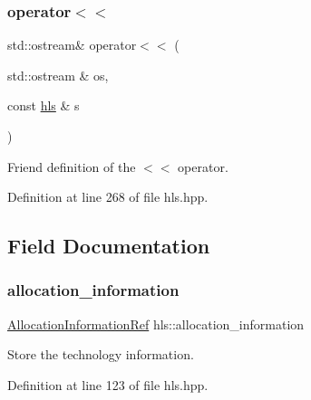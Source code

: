 \subsubsection{\texorpdfstring{operator$<$$<$}{operator<<}}
{\footnotesize\ttfamily std\+::ostream\& operator$<$$<$ (\begin{DoxyParamCaption}\item[{std\+::ostream \&}]{os,  }\item[{const \hyperlink{classhls}{hls} \&}]{s }\end{DoxyParamCaption})\hspace{0.3cm}{\ttfamily [friend]}}



Friend definition of the $<$$<$ operator. 



Definition at line 268 of file hls.\+hpp.



\subsection{Field Documentation}
\mbox{\label{classhls_a277a18e57c5d5a124cfc840174e5a676}} 
\subsubsection{\texorpdfstring{allocation\+\_\+information}{allocation\_information}}
{\footnotesize\ttfamily \hyperlink{allocation__information_8hpp_ad90a86da153cba50cbcefc4679036755}{Allocation\+Information\+Ref} hls\+::allocation\+\_\+information}



Store the technology information. 



Definition at line 123 of file hls.\+hpp.



